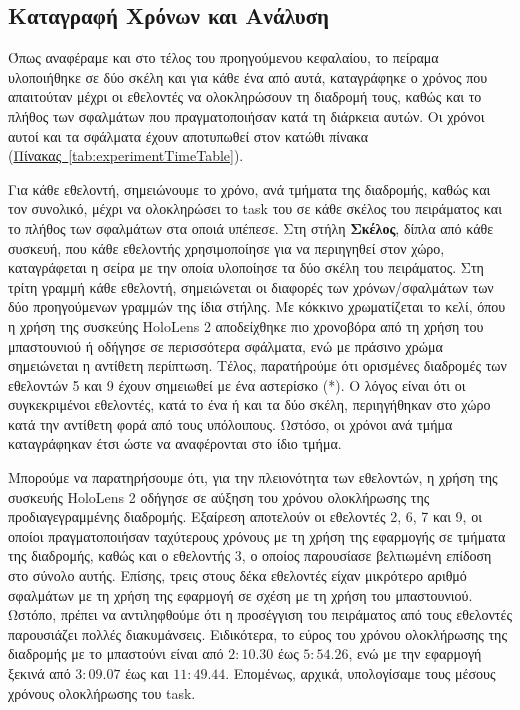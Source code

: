 \subsection{Καταγραφή Χρόνων και Ανάλυση}

Όπως αναφέραμε και στο τέλος του προηγούμενου κεφαλαίου, το πείραμα υλοποιήθηκε σε δύο σκέλη και για κάθε ένα από αυτά, καταγράφηκε ο χρόνος που απαιτούταν μέχρι οι εθελοντές να ολοκληρώσουν τη διαδρομή τους, καθώς και το πλήθος των σφαλμάτων που πραγματοποιήσαν κατά τη διάρκεια αυτών. Οι χρόνοι αυτοί και τα σφάλματα έχουν αποτυπωθεί στον κατώθι πίνακα (\hyperref[tab:experimentTimeTable]{Πίνακας~\ref*{tab:experimentTimeTable}}).



Για κάθε εθελοντή, σημειώνουμε το χρόνο, ανά τμήματα της διαδρομής, καθώς και τον συνολικό, μέχρι να ολοκληρώσει το task του σε κάθε σκέλος του πειράματος και το πλήθος των σφαλμάτων στα οποιά υπέπεσε. Στη στήλη \textbf{Σκέλος}, δίπλα από κάθε συσκευή, που κάθε εθελοντής χρησιμοποίησε για να περιηγηθεί στον χώρο, καταγράφεται η σείρα με την οποία υλοποίησε τα δύο σκέλη του πειράματος. Στη τρίτη γραμμή κάθε εθελοντή, σημειώνεται οι διαφορές των χρόνων/σφαλμάτων των δύο προηγούμενων γραμμών της ίδια στήλης. Με κόκκινο χρωματίζεται το κελί, όπου η χρήση της συσκεύης HoloLens 2 αποδείχθηκε πιο χρονοβόρα από τη χρήση του μπαστουνιού ή οδήγησε σε περισσότερα σφάλματα, ενώ με πράσινο χρώμα σημειώνεται η αντίθετη περίπτωση. Τέλος, παρατήρούμε ότι ορισμένες διαδρομές των εθελοντών 5 και 9 έχουν σημειωθεί με ένα αστερίσκο (*). Ο λόγος είναι ότι οι συγκεκριμένοι εθελοντές, κατά το ένα ή και τα δύο σκέλη, περιηγήθηκαν στο χώρο κατά την αντίθετη φορά από τους υπόλοιπους. Ωστόσο, οι χρόνοι ανά τμήμα καταγράφηκαν έτσι ώστε να αναφέρονται στο ίδιο τμήμα.

Μπορούμε να παρατηρήσουμε ότι, για την πλειονότητα των εθελοντών, η χρήση της συσκευής HoloLens 2 οδήγησε σε αύξηση του χρόνου ολοκλήρωσης της προδιαγεγραμμένης διαδρομής. Εξαίρεση αποτελούν οι εθελοντές 2, 6, 7 και 9, οι οποίοι πραγματοποιήσαν ταχύτερους χρόνους με τη χρήση της εφαρμογής σε τμήματα της διαδρομής, καθώς και ο εθελοντής 3, ο οποίος παρουσίασε βελτιωμένη επίδοση στο σύνολο αυτής. Επίσης, τρεις στους δέκα εθελοντές είχαν μικρότερο αριθμό σφαλμάτων με τη χρήση της εφαρμογή σε σχέση με τη χρήση του μπαστουνιού. Ωστόπο, πρέπει να αντιληφθούμε ότι η προσέγγιση του πειράματος από τους εθελοντές παρουσιάζει πολλές διακυμάνσεις. Ειδικότερα, το εύρος του χρόνου ολοκλήρωσης της διαδρομής με το μπαστούνι είναι από $2:10.30$ έως $5:54.26$, ενώ με την εφαρμογή ξεκινά από $3:09.07$ έως και $11:49.44$. Επομένως, αρχικά, υπολογίσαμε τους μέσους χρόνους ολοκλήρωσης του task.

